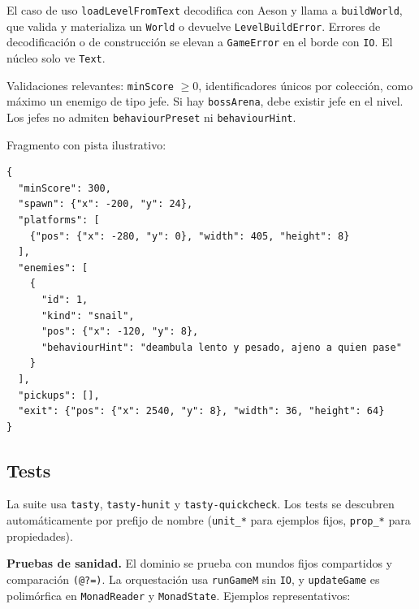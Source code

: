 El caso de uso \texttt{loadLevel\-FromText} decodifica con Aeson y llama a
\texttt{buildWorld}, que valida y materializa un \texttt{World} o devuelve
\texttt{LevelBuildError}. Errores de decodificación o de construcción se elevan a
\texttt{GameError} en el borde con \texttt{IO}. El núcleo solo ve
\texttt{Text}.

Validaciones relevantes: \texttt{minScore} $\geq 0$, identificadores únicos por
colección, como máximo un enemigo de tipo jefe. Si hay \texttt{bossArena},
debe existir jefe en el nivel. Los jefes no admiten \texttt{behaviourPreset} ni
\texttt{behaviourHint}.

Fragmento con pista ilustrativo:

\begin{lstlisting}[language={}]
{
  "minScore": 300,
  "spawn": {"x": -200, "y": 24},
  "platforms": [
    {"pos": {"x": -280, "y": 0}, "width": 405, "height": 8}
  ],
  "enemies": [
    {
      "id": 1,
      "kind": "snail",
      "pos": {"x": -120, "y": 8},
      "behaviourHint": "deambula lento y pesado, ajeno a quien pase"
    }
  ],
  "pickups": [],
  "exit": {"pos": {"x": 2540, "y": 8}, "width": 36, "height": 64}
}
\end{lstlisting}

\subsection{Tests}
\label{subsec:pruebas}

La suite usa \texttt{tasty}, \texttt{tasty-hunit} y \texttt{tasty-quickcheck}.
Los tests se descubren automáticamente por prefijo de nombre
(\texttt{unit\_*} para ejemplos fijos, \texttt{prop\_*} para propiedades).

\textbf{Pruebas de sanidad.} El dominio se prueba con mundos fijos compartidos y
comparación \texttt{(@?=)}. La orquestación usa
\texttt{runGameM} sin \texttt{IO}, y \texttt{updateGame} es polimórfica en
\texttt{MonadReader} y \texttt{MonadState}. Ejemplos representativos:

